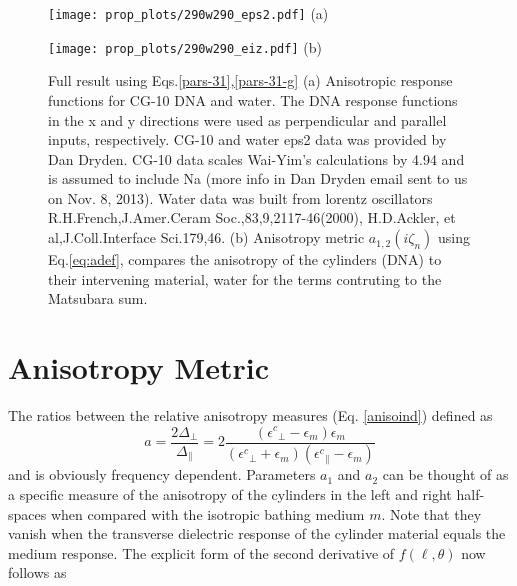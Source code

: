 \documentclass[onecolumn,letterpaper,amsmath,amssymb,floatfix,aps,superscriptaddress]{revtex4}
\begin{document}
\begin{figure}[t!]
\begin{center}
\begin{minipage}[b]{0.40\textwidth}
\begin{center}
\texttt{[image: prop\_plots/290w290\_eps2.pdf]} (a)
\end{center}
\end{minipage}
\hskip 43pt
\begin{minipage}[b]{0.40\textwidth}
\begin{center}
\texttt{[image: prop\_plots/290w290\_eiz.pdf]} (b)
\end{center}
\end{minipage}
\caption{Full result using Eqs.\ref{pars-31},\ref{pars-31-g} (a) Anisotropic response functions for CG-10 DNA and water. The DNA response functions in the x and y directions were used as perpendicular and parallel inputs, respectively.  CG-10 and water eps2 data was provided by Dan Dryden. CG-10 data scales Wai-Yim's calculations by 4.94 and is assumed to include Na (more info in Dan Dryden email sent to us on Nov. 8, 2013).  Water data was built from lorentz oscillators R.H.French,J.Amer.Ceram Soc.,83,9,2117-46(2000), H.D.Ackler, et al,J.Coll.Interface Sci.179,46.
(b) Anisotropy metric $a_{1,2}(i\zeta_n)$ using Eq.\ref{eq:adef}, compares the anisotropy of the  cylinders (DNA) to their intervening material, water for the terms contruting to the Matsubara sum.}
\label{eiz290}
\end{center}
\end{figure} 

\section{Anisotropy Metric}
The ratios between the relative anisotropy measures (Eq. \ref{anisoind}) defined as 
\begin{equation}
a = \frac{2 \Delta_{\perp}}{\Delta_{\parallel}} = 2 \frac{({\epsilon^{c}}_{\perp}-\epsilon_{m}) \epsilon_{m}}{({\epsilon^{c}}_{\perp}+\epsilon_{m}) ({\epsilon^{c}}_{\parallel}-\epsilon_{m})}
\label{eq:adef}
\end{equation}
and is obviously frequency dependent. Parameters $a_1$ and $a_2$ can be thought of as a specific measure of the anisotropy of the cylinders in the left and right half-spaces when 
compared with the isotropic bathing medium $m$. Note that they vanish when the transverse dielectric response of the cylinder material equals the medium response. 
The explicit form of the second derivative of $f(\ell,\theta)$ now follows as 
\end{document}
